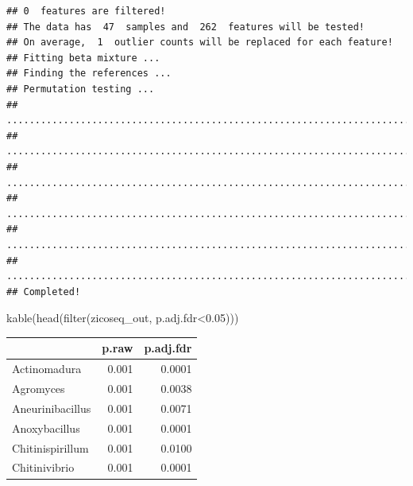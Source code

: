\documentclass[
]{book}
\newenvironment{Shaded}{\begin{snugshade}}{\end{snugshade}}
\newcommand{\AttributeTok}[1]{\textcolor[rgb]{0.77,0.63,0.00}{#1}}
\newcommand{\FloatTok}[1]{\textcolor[rgb]{0.00,0.00,0.81}{#1}}
\newcommand{\FunctionTok}[1]{\textcolor[rgb]{0.00,0.00,0.00}{#1}}
\newcommand{\NormalTok}[1]{#1}
\newcommand{\OtherTok}[1]{\textcolor[rgb]{0.56,0.35,0.01}{#1}}
\newcommand{\SpecialCharTok}[1]{\textcolor[rgb]{0.00,0.00,0.00}{#1}}
\begin{document}
\begin{verbatim}
## 0  features are filtered!
## The data has  47  samples and  262  features will be tested!
## On average,  1  outlier counts will be replaced for each feature!
## Fitting beta mixture ...
## Finding the references ...
## Permutation testing ...
## ...................................................................................................
## ...................................................................................................
## ...................................................................................................
## ...................................................................................................
## ...................................................................................................
## ...................................................................................................
## Completed!
\end{verbatim}

\begin{Shaded}
\end{Shaded}

\begin{Shaded}
\begin{Highlighting}[]
\FunctionTok{kable}\NormalTok{(}\FunctionTok{head}\NormalTok{(}\FunctionTok{filter}\NormalTok{(zicoseq\_out, p.adj.fdr}\SpecialCharTok{\textless{}}\FloatTok{0.05}\NormalTok{)))}
\end{Highlighting}
\end{Shaded}

\begin{tabular}{l|r|r}
\hline
  & p.raw & p.adj.fdr\\
\hline
Actinomadura & 0.001 & 0.0001\\
\hline
Agromyces & 0.001 & 0.0038\\
\hline
Aneurinibacillus & 0.001 & 0.0071\\
\hline
Anoxybacillus & 0.001 & 0.0001\\
\hline
Chitinispirillum & 0.001 & 0.0100\\
\hline
Chitinivibrio & 0.001 & 0.0001\\
\hline
\end{tabular}
\end{document}
